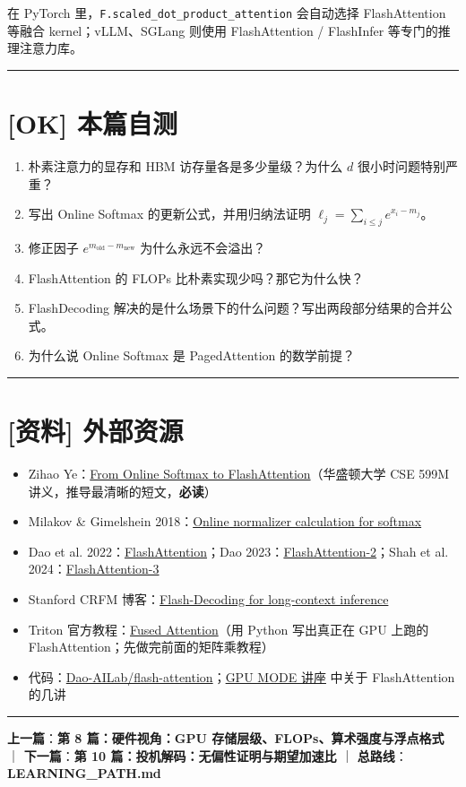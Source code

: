 在 PyTorch 里，\texttt{F.scaled\_dot\_product\_attention} 会自动选择 FlashAttention 等融合 kernel；vLLM、SGLang 则使用 FlashAttention / FlashInfer 等专门的推理注意力库。

\vspace{0.8em}\hrule\vspace{0.8em}

\section{[OK] 本篇自测}

\begin{enumerate}
  \item 朴素注意力的显存和 HBM 访存量各是多少量级？为什么 $d$ 很小时问题特别严重？
  \item 写出 Online Softmax 的更新公式，并用归纳法证明 $\ell_j = \sum_{i \le j} e^{x_i - m_j}$。
  \item 修正因子 $e^{m_{\text{old}} - m_{\text{new}}}$ 为什么永远不会溢出？
  \item FlashAttention 的 FLOPs 比朴素实现少吗？那它为什么快？
  \item FlashDecoding 解决的是什么场景下的什么问题？写出两段部分结果的合并公式。
  \item 为什么说 Online Softmax 是 PagedAttention 的数学前提？
\end{enumerate}

\vspace{0.8em}\hrule\vspace{0.8em}

\section{[资料] 外部资源}

\begin{itemize}
  \item Zihao Ye：\href{https://courses.cs.washington.edu/courses/cse599m/23sp/notes/flashattn.pdf}{From Online Softmax to FlashAttention}（华盛顿大学 CSE 599M 讲义，推导最清晰的短文，\textbf{必读}）
  \item Milakov \& Gimelshein 2018：\href{https://arxiv.org/abs/1805.02867}{Online normalizer calculation for softmax}
  \item Dao et al. 2022：\href{https://arxiv.org/abs/2205.14135}{FlashAttention}；Dao 2023：\href{https://arxiv.org/abs/2307.08691}{FlashAttention-2}；Shah et al. 2024：\href{https://arxiv.org/abs/2407.08608}{FlashAttention-3}
  \item Stanford CRFM 博客：\href{https://crfm.stanford.edu/2023/10/12/flashdecoding.html}{Flash-Decoding for long-context inference}
  \item Triton 官方教程：\href{https://triton-lang.org/main/getting-started/tutorials/06-fused-attention.html}{Fused Attention}（用 Python 写出真正在 GPU 上跑的 FlashAttention；先做完前面的矩阵乘教程）
  \item 代码：\href{https://github.com/Dao-AILab/flash-attention}{Dao-AILab/flash-attention}；\href{https://github.com/gpu-mode/lectures}{GPU MODE 讲座} 中关于 FlashAttention 的几讲
\end{itemize}

\vspace{0.8em}\hrule\vspace{0.8em}

\textbf{上一篇}：\textbf{第 8 篇：硬件视角：GPU 存储层级、FLOPs、算术强度与浮点格式} ｜ \textbf{下一篇}：\textbf{第 10 篇：投机解码：无偏性证明与期望加速比} ｜ \textbf{总路线}：\textbf{LEARNING\_PATH.md}
